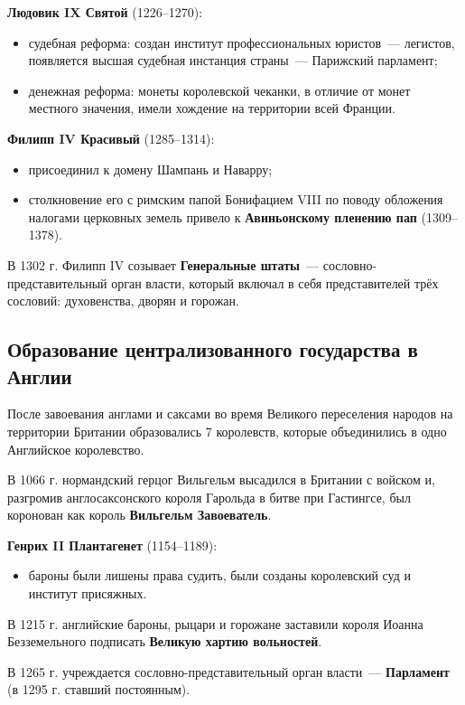 \documentclass[a4paper, 12pt]{article}
\begin{document}
\textbf{Людовик IX Святой} (1226--1270):
\begin{itemize}[noitemsep]
  \item судебная реформа: создан институт профессиональных юристов~---
  легистов, появляется высшая судебная инстанция страны~--- Парижский
  парламент;
  \item денежная реформа: монеты королевской чеканки, в отличие от монет
  местного значения, имели хождение на территории всей Франции.
\end{itemize}

\textbf{Филипп IV Красивый} (1285--1314):
\begin{itemize}[noitemsep]
  \item присоединил к домену Шампань и Наварру;
  \item столкновение его с римским папой Бонифацием VIII по поводу обложения
  налогами церковных земель привело к \textbf{Авиньонскому пленению пап}
  (1309--1378).
\end{itemize}

В 1302 г. Филипп IV созывает \textbf{Генеральные штаты}~---
сословно-представительный орган власти, который включал в себя
представителей трёх сословий: духовенства, дворян и горожан.

\subsection{Образование централизованного государства в Англии}
После завоевания англами и саксами во время Великого переселения народов на
территории Британии образовались 7 королевств, которые объединились в одно
Английское королевство.

В 1066 г. нормандский герцог Вильгельм высадился в Британии с войском и,
разгромив англосаксонского короля Гарольда в битве при Гастингсе, был
коронован как король \textbf{Вильгельм Завоеватель}.

\textbf{Генрих II Плантагенет} (1154--1189):
\begin{itemize}[noitemsep]
  \item бароны были лишены права судить, были созданы королевский суд
  и институт присяжных.
\end{itemize}

В 1215 г. английские бароны, рыцари и горожане заставили короля Иоанна
Безземельного подписать \textbf{Великую хартию вольностей}.

В 1265 г. учреждается сословно-представительный орган власти~---
\textbf{Парламент} (в 1295 г. ставший постоянным).
\end{document}
